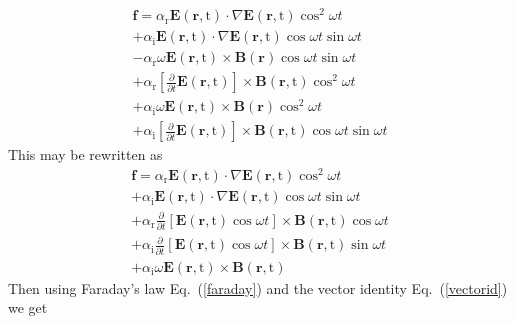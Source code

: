 \begin{align}
&\mathbf{f}=\alpha_{\mathrm{r}}\mathbf{E}(\mathbf{r},\mathrm{t})\cdot\nabla\mathbf{E}(\mathbf{r},\mathrm{t})\cos^2{\omega t}& \nonumber \\
&+\alpha_{\mathrm{i}}\mathbf{E}(\mathbf{r},\mathrm{t})\cdot\nabla\mathbf{E}(\mathbf{r},\mathrm{t})\cos{\omega t}\sin{\omega t}& \nonumber \\
& -\alpha_{\mathrm{r}}\omega\mathbf{E}(\mathbf{r},\mathrm{t})\times\mathbf{B}(\mathbf{r})\cos{\omega t}\sin{\omega t}& \nonumber \\
&+
\alpha_{\mathrm{r}}\left[\frac{\partial}{\partial t}\mathbf{E}(\mathbf{r},\mathrm{t})\right]\times\mathbf{B}(\mathbf{r},\mathrm{t})\cos^2{\omega t}& \nonumber \\
&+\alpha_{\mathrm{i}}\omega\mathbf{E}(\mathbf{r},\mathrm{t})\times\mathbf{B}(\mathbf{r})\cos^2{\omega t}& \nonumber \\
&+
\alpha_{\mathrm{i}}\left[\frac{\partial}{\partial t}\mathbf{E}(\mathbf{r},\mathrm{t})\right]\times\mathbf{B}(\mathbf{r},\mathrm{t})\cos{\omega t}\sin{\omega t}&
\end{align}
This may be rewritten as 
\begin{align}
&\mathbf{f}=\alpha_{\mathrm{r}}\mathbf{E}(\mathbf{r},\mathrm{t})\cdot\nabla\mathbf{E}(\mathbf{r},\mathrm{t})\cos^2{\omega t}& \nonumber \\
&+\alpha_{\mathrm{i}}\mathbf{E}(\mathbf{r},\mathrm{t})\cdot\nabla\mathbf{E}(\mathbf{r},\mathrm{t})\cos{\omega t}\sin{\omega t}& \nonumber \\
&+
\alpha_{\mathrm{r}}\frac{\partial}{\partial t}\left[\mathbf{E}(\mathbf{r},\mathrm{t})\cos{\omega t}\right]\times\mathbf{B}(\mathbf{r},\mathrm{t})\cos{\omega t}& \nonumber \\
&+
\alpha_{\mathrm{i}}\frac{\partial}{\partial t}\left[\mathbf{E}(\mathbf{r},\mathrm{t})\cos{\omega t}\right]\times\mathbf{B}(\mathbf{r},\mathrm{t})\sin{\omega t}& \nonumber \\
&+\alpha_{\mathrm{i}}\omega\mathbf{E}(\mathbf{r},\mathrm{t})\times\mathbf{B}(\mathbf{r},\mathrm{t})&
\end{align}
Then using Faraday's law Eq.\ (\ref{faraday}) and the vector identity Eq.\ (\ref{vectorid}) we get
